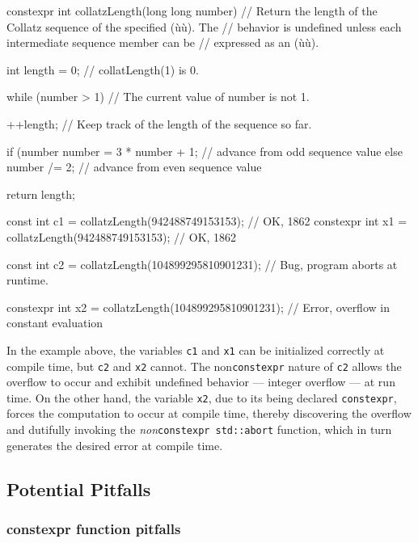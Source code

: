 \begin{emcppslisting}[emcppsstandards={c++14}]
constexpr int collatzLength(long long number)
    // Return the length of the Collatz sequence of the specified (ù{}ù). The
    // behavior is undefined unless each intermediate sequence member can be
    // expressed as an (ù{}ù).
{
    int length = 0;         // collatLength(1) is 0.

    while (number > 1)      // The current value of number is not 1.
    {
        ++length;           // Keep track of the length of the sequence so far.

        if (number %
        {
            number = 3 * number + 1;    // advance from odd sequence value
        }
        else
        {
            number /= 2;                // advance from even sequence value
        }
    }

    return length;
}

const     int c1 = collatzLength(942488749153153);  // OK, 1862
constexpr int x1 = collatzLength(942488749153153);  // OK, 1862

const int c2 = collatzLength(104899295810901231);
    // Bug, program aborts at runtime.

constexpr int x2 = collatzLength(104899295810901231);
    // Error, overflow in constant evaluation
\end{emcppslisting}

\noindent In the example above, the variables \lstinline!c1! and \lstinline!x1! can be
initialized correctly at compile time, but \lstinline!c2! and \lstinline!x2!
cannot. The non\lstinline!constexpr! nature of \lstinline!c2! allows the
overflow to occur and exhibit undefined behavior --- integer overflow
--- at run time. On the other hand, the variable \lstinline!x2!, due to
its being declared \lstinline!constexpr!, forces the computation to
occur at compile time, thereby discovering the overflow and dutifully
invoking the \emph{non}\lstinline!constexpr!~\lstinline!std::abort! function,
which in turn generates the desired error at compile time.

\subsection[Potential Pitfalls]{Potential Pitfalls}\label{potential-pitfalls-constexprvar}

\subsubsection[\lstinline!constexpr! function pitfalls]{{\SubsubsecCode constexpr} function pitfalls}\label{constexpr-function-pitfalls}

